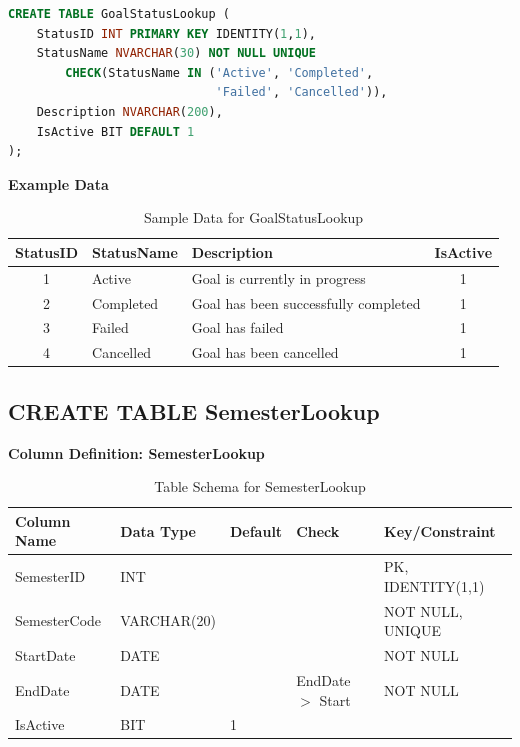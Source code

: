\documentclass[12pt,a4paper]{report}
\begin{document}
\vspace{0.3cm}

\begin{lstlisting}[language=SQL, caption=Create Table GoalStatusLookup]
CREATE TABLE GoalStatusLookup (
    StatusID INT PRIMARY KEY IDENTITY(1,1),
    StatusName NVARCHAR(30) NOT NULL UNIQUE 
        CHECK(StatusName IN ('Active', 'Completed', 
                             'Failed', 'Cancelled')),
    Description NVARCHAR(200),
    IsActive BIT DEFAULT 1
);
\end{lstlisting}
\vspace{1cm}
\textbf{Example Data}

\begin{table}[ht]
\centering
\small
\begin{tabular}{|c|l|p{4.5cm}|c|}
\hline
\textbf{StatusID} & \textbf{StatusName} & \textbf{Description} & \textbf{IsActive} \\ \hline
1 & Active & Goal is currently in progress & 1 \\ \hline
2 & Completed & Goal has been successfully completed & 1 \\ \hline
3 & Failed & Goal has failed & 1 \\ \hline
4 & Cancelled & Goal has been cancelled & 1 \\ \hline
\end{tabular}
\caption{Sample Data for GoalStatusLookup}
\label{tab:goal_status_lookup_data}
\end{table}

\vspace{1cm}

\subsection{CREATE TABLE SemesterLookup}

\textbf{Column Definition: SemesterLookup}

\begin{table}[ht]
\centering
\small
\begin{tabular}{|l|l|l|l|l|}
\hline
\textbf{Column Name} & \textbf{Data Type} & \textbf{Default} & \textbf{Check} & \textbf{Key/Constraint} \\ \hline
SemesterID & INT & & & PK, IDENTITY(1,1) \\ \hline
SemesterCode & VARCHAR(20) & & & NOT NULL, UNIQUE \\ \hline
StartDate & DATE & & & NOT NULL \\ \hline
EndDate & DATE & & EndDate $>$ Start & NOT NULL \\ \hline
IsActive & BIT & 1 & & \\ \hline
\end{tabular}
\caption{Table Schema for SemesterLookup}
\label{tab:semester_lookup_schema}
\end{table}
\end{document}
